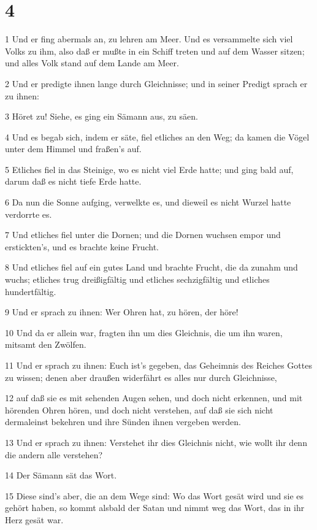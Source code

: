 \chapter{4}

\par 1 Und er fing abermals an, zu lehren am Meer. Und es versammelte sich viel Volks zu ihm, also daß er mußte in ein Schiff treten und auf dem Wasser sitzen; und alles Volk stand auf dem Lande am Meer.
\par 2 Und er predigte ihnen lange durch Gleichnisse; und in seiner Predigt sprach er zu ihnen:
\par 3 Höret zu! Siehe, es ging ein Sämann aus, zu säen.
\par 4 Und es begab sich, indem er säte, fiel etliches an den Weg; da kamen die Vögel unter dem Himmel und fraßen's auf.
\par 5 Etliches fiel in das Steinige, wo es nicht viel Erde hatte; und ging bald auf, darum daß es nicht tiefe Erde hatte.
\par 6 Da nun die Sonne aufging, verwelkte es, und dieweil es nicht Wurzel hatte verdorrte es.
\par 7 Und etliches fiel unter die Dornen; und die Dornen wuchsen empor und erstickten's, und es brachte keine Frucht.
\par 8 Und etliches fiel auf ein gutes Land und brachte Frucht, die da zunahm und wuchs; etliches trug dreißigfältig und etliches sechzigfältig und etliches hundertfältig.
\par 9 Und er sprach zu ihnen: Wer Ohren hat, zu hören, der höre!
\par 10 Und da er allein war, fragten ihn um dies Gleichnis, die um ihn waren, mitsamt den Zwölfen.
\par 11 Und er sprach zu ihnen: Euch ist's gegeben, das Geheimnis des Reiches Gottes zu wissen; denen aber draußen widerfährt es alles nur durch Gleichnisse,
\par 12 auf daß sie es mit sehenden Augen sehen, und doch nicht erkennen, und mit hörenden Ohren hören, und doch nicht verstehen, auf daß sie sich nicht dermaleinst bekehren und ihre Sünden ihnen vergeben werden.
\par 13 Und er sprach zu ihnen: Verstehet ihr dies Gleichnis nicht, wie wollt ihr denn die andern alle verstehen?
\par 14 Der Sämann sät das Wort.
\par 15 Diese sind's aber, die an dem Wege sind: Wo das Wort gesät wird und sie es gehört haben, so kommt alsbald der Satan und nimmt weg das Wort, das in ihr Herz gesät war.
